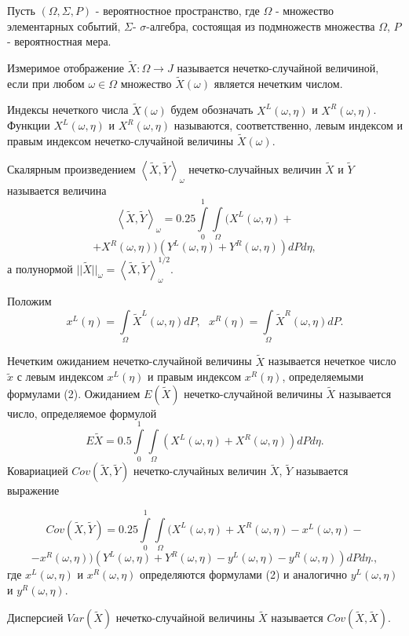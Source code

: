 Пусть $(\Omega, \Sigma, P)$ - вероятностное пространство, где $\Omega$ - множество элементарных событий, $\Sigma $- $\sigma$-алгебра, состоящая из  подмножеств множества $\Omega$, $P$ - вероятностная мера.

Измеримое отображение $\tilde{X}:\Omega\rightarrow J$ называется нечетко-случайной величиной, если при любом $\omega\in\Omega$ множество $\tilde{X}(\omega)$ является нечетким числом.

Индексы нечеткого числа $\tilde{X}(\omega)$  будем обозначать $X^L(\omega, \eta)$ и $X^R(\omega, \eta)$. Функции $X^L(\omega, \eta)$ и $X^R(\omega, \eta)$ называются, соответственно, левым индексом и правым индексом нечетко-случайной величины $\tilde{X}(\omega)$.



Скалярным произведением $\left\langle \tilde{X}, \tilde{Y}\right\rangle_{\omega}$ нечетко-случайных величин $\tilde{X}$ и $\tilde{Y}$ называется величина
$$
\left\langle \tilde{X}, \tilde{Y}\right\rangle_{\omega} =  0.25\int\limits_0^1\int\limits_{\Omega}(X^L(\omega, \eta) +
$$
$$
 + X^R(\omega, \eta))(Y^L(\omega, \eta) + Y^R(\omega, \eta))dPd\eta,
$$
а полунормой $||\tilde{X}||_{\omega} = \left\langle \tilde{X}, \tilde{Y}\right\rangle_{\omega}^{1/2}.$


Положим
\begin{equation}
x^L(\eta) = \int\limits_{\Omega}\tilde{X}^L(\omega, \eta)dP,\,\,\,\,x^R(\eta) = \int\limits_{\Omega}\tilde{X}^R(\omega, \eta)dP.
\end{equation}

 Нечетким ожиданием нечетко-случайной величины $\tilde{X}$ называется нечеткое число $\tilde{x}$ с левым индексом $x^L(\eta)$ и правым индексом $x^R(\eta)$, определяемыми  формулами (2). Ожиданием $E(\tilde{X})$ нечетко-случайной величины $\tilde{X}$ называется число, определяемое формулой
$$
E\tilde{X} = 0.5\int\limits_0^1\int\limits_{\Omega}(X^L(\omega, \eta) + X^R(\omega, \eta))dPd\eta.
$$
Ковариацией $Cov(\tilde{X}, \tilde{Y})$ нечетко-случайных величин $\tilde{X}$, $\tilde{Y}$ называется выражение

$$
Cov(\tilde{X}, \tilde{Y}) =  0.25\int\limits_0^1\int\limits_{\Omega}(X^L(\omega, \eta) + X^R(\omega, \eta) - x^L(\omega, \eta) - $$
$$
-x^R(\omega, \eta))(Y^L(\omega, \eta) + Y^R(\omega, \eta) - y^L(\omega, \eta) - y^R(\omega, \eta))dPd\eta.
,
$$
где  $x^L(\omega, \eta)$ и  $x^R(\omega, \eta)$ определяются формулами (2) и аналогично $y^L(\omega, \eta)$ и  $y^R(\omega, \eta)$.


Дисперсией $Var(\tilde{X})$ нечетко-случайной величины $\tilde{X}$ называется $Cov(\tilde{X}, \tilde{X})$.



